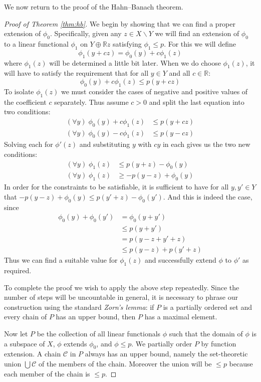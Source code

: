 \documentclass[11pt,oneside]{amsbook}
\renewcommand{\setminus}{\smallsetminus}
\newcommand{\RR}{{\mathbb R}}
\theoremstyle{definition}
\theoremstyle{plain}
\theoremstyle{definition}
\theoremstyle{remark}
\numberwithin{equation}{section}
\numberwithin{figure}{section}
\begin{document}
We now return to the proof of the Hahn--Banach theorem.

\begin{proof}[Proof of Theorem \ref{thm:hb}]
  We begin by showing that we can find a proper extension of $\phi_0$. Specifically, given any $z\in X\setminus Y$ we will find an extension of $\phi_0$ to a linear functional $\phi_1$ on $Y\oplus\RR z$ satisfying $\phi_1\leq p$. For this we will define
  \[\phi_1(y+cz)=\phi_0(y)+c\phi_1(z)
  \]
  where $\phi_1(z)$ will be determined a little bit later. When we do choose $\phi_1(z)$, it will have to satisfy the requirement that for all $y\in Y$ and all $c\in\RR$:
  \[\phi_0(y)+c\phi_1(z)\leq p(y+cz)
  \]
  To isolate $\phi_1(z)$ we must consider the cases of negative and positive values of the coefficient $c$ separately. Thus assume $c>0$ and split the last equation into two conditions:
  \begin{align*}
    (\forall y)\;\phi_0(y)+c\phi_1(z)&\leq p(y+cz)\\
    (\forall y)\;\phi_0(y)-c\phi_1(z)&\leq p(y-cz)
  \end{align*}
  Solving each for $\phi'(z)$ and substituting $y$ with $cy$ in each gives us the two new conditions:
  \begin{align*}
    (\forall y)\;\phi_1(z)&\leq p(y+z)-\phi_0(y)\\
    (\forall y)\;\phi_1(z)&\geq-p(y-z)+\phi_0(y)
  \end{align*}
  In order for the constraints to be satisfiable, it is sufficient to have for all $y,y'\in Y$ that $-p(y-z)+\phi_0(y)\leq p(y'+z)-\phi_0(y')$. And this is indeed the case, since
  \begin{align*}
    \phi_0(y)+\phi_0(y')&=\phi_0(y+y')\\
                       &\leq p(y+y')\\
                       &=p(y-z+y'+z)\\
                       &\leq p(y-z)+p(y'+z)
  \end{align*}
  Thus we can find a suitable value for $\phi_1(z)$ and successfully extend $\phi$ to $\phi'$ as required.

  To complete the proof we wish to apply the above step repeatedly. Since the number of steps will be uncountable in general, it is necessary to phrase our construction using the standard \emph{Zorn's lemma}: if $P$ is a partially ordered set and every chain of $P$ has an upper bound, then $P$ has a maximal element.

  Now let $P$ be the collection of all linear functionals $\phi$ such that the domain of $\phi$ is a subspace of $X$, $\phi$ extends $\phi_0$, and $\phi\leq p$. We partially order $P$ by function extension. A chain $\mathcal C$ in $P$ always has an upper bound, namely the set-theoretic union $\bigcup\mathcal C$ of the members of the chain. Moreover the union will be $\leq p$ because each member of the chain is $\leq p$.


\end{proof}
\end{document}
